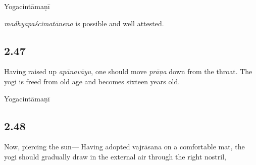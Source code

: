 \begin{ekdosis}
\begin{sources}[hp02_046]
\end{sources}

\begin{testimonia}[hp02_046]
Yogacintāmaṇī

\begin{versinnote}
\end{versinnote}
\end{testimonia}

\begin{philcomm}[hp02_046]
\emph{madhyapaścimatānena} is possible and well attested.
\end{philcomm}

\subsection*{2.47}
\begin{translation}[hp02_047]
Having raised up \emph{apānavāyu}, one should move \emph{prāṇa} down from the throat. The yogi is freed from old age and becomes sixteen years old.
\end{translation}

\begin{sources}[hp02_047]
\end{sources}

\begin{testimonia}[hp02_047]
Yogacintāmaṇī 

\begin{versinnote}
\end{versinnote}
\end{testimonia}

\begin{philcomm}[hp02_047]
\end{philcomm}

\subsection*{2.48}
\begin{translation}[hp02_048]
Now, piercing the sun---
Having adopted vajrāsana on a comfortable mat, the yogi should gradually draw in the external air through the right nostril,
\end{translation}


\end{ekdosis}
